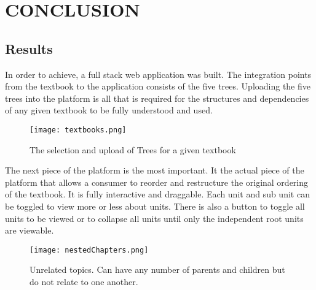 %
%
%
%

\chapter{CONCLUSION}

\section{Results}

In order to achieve, a full stack web application was built. The integration points from the textbook to the application consists of the five trees. Uploading the five trees into the platform is all that is required for the structures and dependencies of any given textbook to be fully understood and used.

\begin{figure}[ht]
    \centering
    \texttt{[image: textbooks.png]}
    \caption[]{The selection and upload of Trees for a given textbook}
        
    \label{fig:textbooks}
\end{figure}

The next piece of the platform is the most important. It the actual piece of the platform that allows a consumer to reorder and restructure the original ordering of the textbook. It is fully interactive and draggable. Each unit and sub unit can be toggled to view more or less about units. There is also a button to toggle all units to be viewed or to collapse all units until only the independent root units are viewable.

\begin{figure}[ht]
    \centering
    \texttt{[image: nestedChapters.png]}
    \caption[Unrelated topics.]{Unrelated topics. Can have any number of parents and children but do not relate to one another.}
        
    \label{fig:nestedChapters}
\end{figure}

